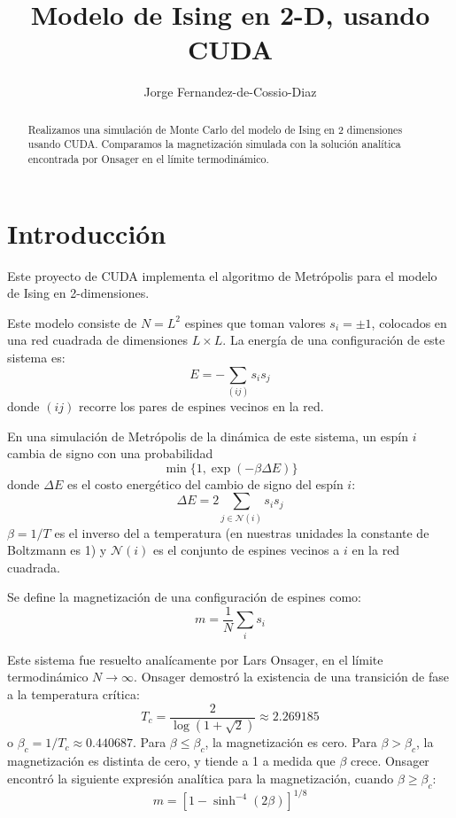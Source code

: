 \documentclass{article}
\begin{document}
\title{Modelo de Ising en 2-D, usando CUDA}
\author{Jorge Fernandez-de-Cossio-Diaz}

\maketitle

\begin{abstract}
    Realizamos una simulación de Monte Carlo del modelo de Ising en 2 dimensiones usando CUDA.
    Comparamos la magnetización simulada con la solución analítica encontrada por Onsager en el límite termodinámico.
\end{abstract}

\section*{Introducción}

Este proyecto de CUDA implementa el algoritmo de Metrópolis para el modelo de Ising en 2-dimensiones.

Este modelo consiste de $N=L^2$ espines que toman valores $s_i=\pm 1$, colocados en una red cuadrada de dimensiones $L\times L$.
La energía de una configuración de este sistema es:
\begin{equation}
    E = -\sum_{(ij)} s_i s_j
\end{equation}
donde $(ij)$ recorre los pares de espines vecinos en la red.

En una simulación de Metrópolis de la dinámica de este sistema, un espín $i$ cambia de signo con una probabilidad
\begin{equation}
    \min\{1, \exp(-\beta\Delta E)\}
\end{equation}
donde $\Delta E$ es el costo energético del cambio de signo del espín $i$:
\begin{equation}
    \Delta E = 2\sum_{j\in\mathcal N(i)} s_i s_j
\end{equation}
$\beta=1/T$ es el inverso del a temperatura (en nuestras unidades la constante de Boltzmann es 1) y $\mathcal N(i)$ es el conjunto de espines vecinos a $i$ en la red cuadrada.

Se define la magnetización de una configuración de espines como:
\begin{equation}
    m=\frac{1}{N}\sum_i s_i
\end{equation}

Este sistema fue resuelto analícamente por Lars Onsager, en el límite termodinámico $N\rightarrow\infty$.
Onsager demostró la existencia de una transición de fase a la temperatura crítica:
\begin{equation}
    T_c = \frac{2}{\log(1 + \sqrt 2)} \approx 2.269185
\end{equation}
o $\beta_c=1/T_c\approx0.440687$.
Para $\beta\le\beta_c$, la magnetización es cero.
Para $\beta>\beta_c$, la magnetización es distinta de cero, y tiende a 1 a medida que $\beta$ crece.
Onsager encontró la siguiente expresión analítica para la magnetización, cuando $\beta\ge\beta_c$:
\begin{equation}
    m = [1-\sinh^{-4}(2\beta)]^{1/8}
    \label{eq:onsager}
\end{equation}
\end{document}
